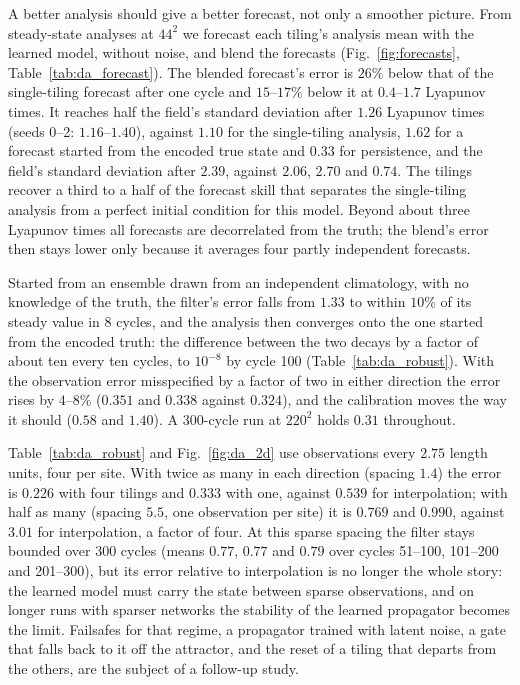  A better analysis should give a better
forecast, not only a smoother picture. From steady-state analyses at
$44^2$ we forecast each tiling's analysis mean with the learned model,
without noise, and blend the forecasts (Fig.~\ref{fig:forecasts},
Table~\ref{tab:da_forecast}). The blended forecast's error is $26\%$ below
that of the single-tiling forecast after one cycle and $15$--$17\%$ below it
at $0.4$--$1.7$ Lyapunov times. It reaches half the field's standard
deviation after $1.26$ Lyapunov times (seeds 0--2: $1.16$--$1.40$), against $1.10$ for
the single-tiling analysis, $1.62$ for a forecast started from the encoded
true state and $0.33$ for persistence, and the field's standard deviation
after $2.39$, against $2.06$, $2.70$ and $0.74$. The tilings recover a third to a half
of the forecast skill that separates the single-tiling analysis from a
perfect initial condition for this model. Beyond about three Lyapunov
times all forecasts are decorrelated from the truth; the blend's error
then stays lower only because it averages four partly independent
forecasts.

 Started from an ensemble drawn from an independent
climatology, with no knowledge of the truth, the filter's error falls
from $1.33$ to within $10\%$ of its steady value in 8 cycles, and the analysis
then converges onto the one started from the encoded truth: the
difference between the two decays by a factor of about ten every ten
cycles, to $10^{-8}$ by cycle 100 (Table~\ref{tab:da_robust}). With the
observation error misspecified by a factor of two in either direction
the error rises by $4$--$8\%$ ($0.351$ and $0.338$ against $0.324$), and the calibration
moves the way it should ($0.58$ and $1.40$). A 300-cycle run at $220^2$ holds $0.31$ throughout.

 Table~\ref{tab:da_robust} and Fig.~\ref{fig:da_2d}
use observations every $2.75$ length units, four per site. With twice as
many in each direction (spacing $1.4$) the error is $0.226$ with four tilings and
$0.333$ with one, against $0.539$ for interpolation; with half as many (spacing
$5.5$, one observation per site) it is $0.769$ and $0.990$, against $3.01$ for
interpolation, a factor of four. At this sparse spacing the filter stays
bounded over 300 cycles (means $0.77$, $0.77$ and $0.79$ over cycles 51--100,
101--200 and 201--300), but its error relative to interpolation is no
longer the whole story: the learned model must carry the state between
sparse observations, and on longer runs with sparser networks the
stability of the learned propagator becomes the limit. Failsafes for that
regime, a propagator trained with latent noise, a gate that falls back to
it off the attractor, and the reset of a tiling that departs from the
others, are the subject of a follow-up study.


